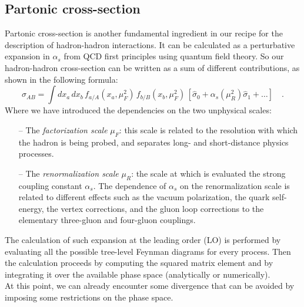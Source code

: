 %
%

\subsection{Partonic cross-section}

Partonic cross-section is another fundamental ingredient in our recipe for the description of hadron-hadron interactions. It can be calculated as a perturbative expansion in $\alpha_s$ from QCD first principles using quantum field theory. So our hadron-hadron cross-section can be written as a sum of different contributions, as shown in the following formula:
\begin{equation}
	\sigma_{AB}=\displaystyle\int dx_a\,dx_b\,f_{a/A}(x_a,\mu_F^2)\,f_{b/B}(x_b,\mu_F^2)\,\left[\hat{\sigma}_0+\alpha_s(\mu_R^2)\hat{\sigma}_1+\dots\right]\quad .
\label{eq:factorization3}
\end{equation}
Where we have introduced the dependencies on the two unphysical scales:
\begin{itemize}
	\item[--] The \textit{factorization scale} $\mu_F$: this scale is related to the resolution with which the hadron is being probed, and separates long- and short-distance physics processes.
	\item[--] The \textit{renormalization scale} $\mu_R$: the scale at which is evaluated the strong coupling constant $\alpha_s$. The dependence of $\alpha_s$ on the renormalization scale is related to different effects such as the vacuum polarization, the quark self-energy, the vertex corrections, and the gluon loop corrections to the elementary three-gluon and four-gluon couplings.
\end{itemize}
The calculation of such expansion at the leading order (LO) is performed by evaluating all the possible tree-level Feynman diagrams for every process. Then the calculation proceeds by computing the squared matrix element and by integrating it over the available phase space (analytically or numerically).
\\
At this point, we can already encounter some divergence that can be avoided by imposing some  restrictions on the phase space.

